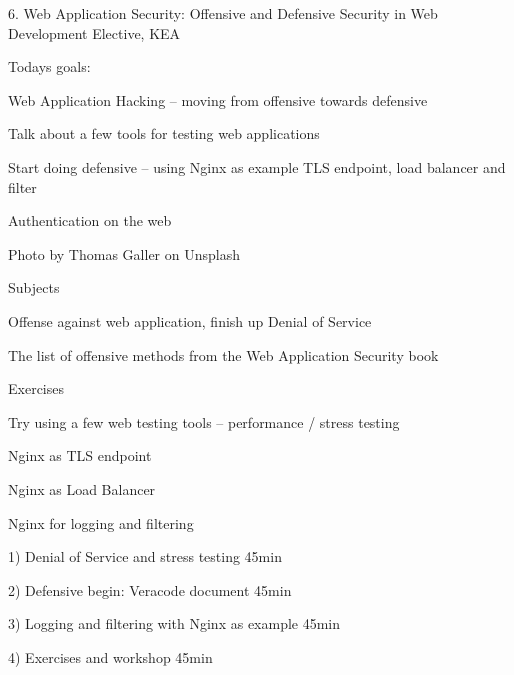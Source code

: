 \documentclass[Screen16to9,17pt]{foils}
\begin{document}
\mytitlepage
{6. Web Application Security: Offensive and Defensive}
{Security in Web Development Elective, KEA}




Todays goals:
\begin{list2}
\item Web Application Hacking -- moving from offensive towards defensive
\item Talk about a few tools for testing web applications
\item Start doing defensive -- using Nginx as example TLS endpoint, load balancer and filter
\item Authentication on the web
\end{list2}

Photo by Thomas Galler on Unsplash




\begin{list1}
\item Subjects
\begin{list2}
\item Offense against web application, finish up Denial of Service
\item The list of offensive methods from the Web Application Security book
\end{list2}
\item Exercises
\begin{list2}
\item Try using a few web testing tools -- performance / stress testing
\item Nginx as TLS endpoint
\item Nginx as Load Balancer
\item Nginx for logging and filtering
\end{list2}
\end{list1}


\begin{list2}
\item 1) Denial of Service and stress testing 45min
\item 2) Defensive begin: Veracode document 45min
\item 3) Logging and filtering with Nginx as example 45min
\item 4) Exercises and workshop 45min
\end{list2}
\end{document}
